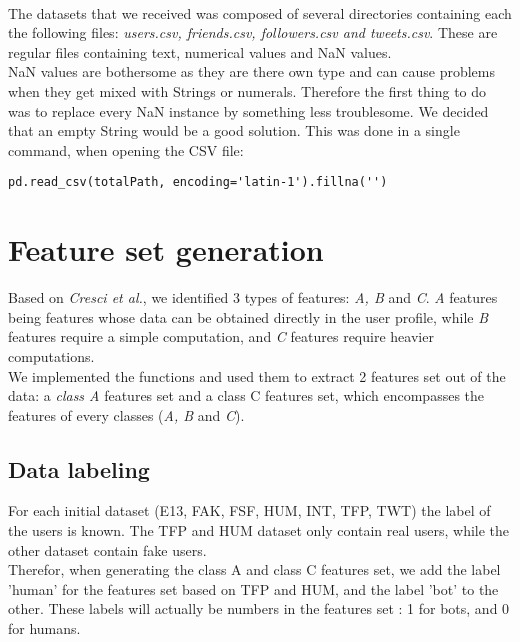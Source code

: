 \documentclass[a4paper,11pt]{article}
\begin{document}
\paragraph{}
The datasets that we received was composed of several directories containing each the following files: \textit{users.csv, friends.csv, followers.csv and tweets.csv}. These are regular files containing text, numerical values and NaN values.\\

NaN values are bothersome as they are there own type and can cause problems when they get mixed with Strings or numerals. Therefore the first thing to do was to replace every NaN instance by something less troublesome. We decided that an empty String would be a good solution. This was done in a single command, when opening the CSV file:

\begin{lstlisting}
pd.read_csv(totalPath, encoding='latin-1').fillna('')
\end{lstlisting}

\section{Feature set generation}
Based on \textit{Cresci et al.}, we identified 3 types of features: \textit{A, B} and \textit{C}. \textit{A} features being features whose data can be obtained directly in the user profile, while \textit{B} features require a simple computation, and \textit{C} features require heavier computations.\\

We implemented the functions and used them to extract 2 features set out of the data: a \textit{class A} features set and a class C features set, which encompasses the features of every classes (\textit{A, B} and \textit{C}).

\subsection{Data labeling}
For each initial dataset (E13, FAK, FSF, HUM, INT, TFP, TWT) the label of the users is known. The TFP and HUM dataset only contain real users, while the other dataset contain fake users.\\

Therefor, when generating the class A and class C features set, we add the label 'human' for the features set based on TFP and HUM, and the label 'bot' to the other. These labels will actually be numbers in the features set : 1 for bots, and 0 for humans.
\end{document}
